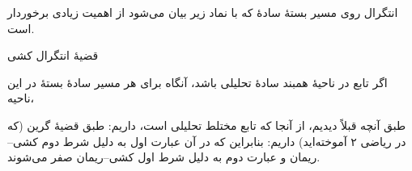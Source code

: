\begin{EMexample}{}


\end{EMexample}

\begin{EMexample}{}


\end{EMexample}


انتگرال روی مسیر بستهٔ سادهٔ  که با نماد زیر بیان می‌شود از اهمیت زیادی برخوردار است.

\begin{EMtheorem}{قضیهٔ انتگرال کشی}

اگر تابع  در ناحیهٔ همبند سادهٔ  تحلیلی باشد، آنگاه برای هر مسیر سادهٔ بستهٔ  در این ناحیه،

\end{EMtheorem}

\begin{EMjoin}

\begin{EMunit}


\end{EMunit}

\begin{EMproof}{}

طبق آنچه قبلاً دیدیم، از آنجا که تابع مختلط تحلیلی است، داریم:
طبق قضیهٔ گرین (که در ریاضی ۲ آموخته‌اید) داریم:
بنابراین
که در آن عبارت اول به دلیل شرط دوم کشی--ریمان و عبارت دوم به دلیل شرط اول کشی--ریمان صفر می‌شوند.

\end{EMproof}

\end{EMjoin}

